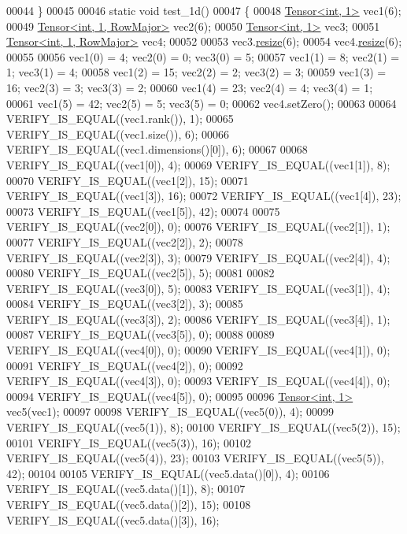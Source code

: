 \begin{DoxyCode}
00044 \}
00045 
00046 \textcolor{keyword}{static} \textcolor{keywordtype}{void} test\_1d()
00047 \{
00048   \hyperlink{class_eigen_1_1_tensor}{Tensor<int, 1>} vec1(6);
00049   \hyperlink{class_eigen_1_1_tensor}{Tensor<int, 1, RowMajor>} vec2(6);
00050   \hyperlink{class_eigen_1_1_tensor}{Tensor<int, 1>} vec3;
00051   \hyperlink{class_eigen_1_1_tensor}{Tensor<int, 1, RowMajor>} vec4;
00052 
00053   vec3.\hyperlink{class_eigen_1_1_tensor_a5ab1ec6dc9b05d5e4db3600bc9d2cc6b}{resize}(6);
00054   vec4.\hyperlink{class_eigen_1_1_tensor_a5ab1ec6dc9b05d5e4db3600bc9d2cc6b}{resize}(6);
00055 
00056   vec1(0) = 4;  vec2(0) = 0; vec3(0) = 5;
00057   vec1(1) = 8;  vec2(1) = 1; vec3(1) = 4;
00058   vec1(2) = 15; vec2(2) = 2; vec3(2) = 3;
00059   vec1(3) = 16; vec2(3) = 3; vec3(3) = 2;
00060   vec1(4) = 23; vec2(4) = 4; vec3(4) = 1;
00061   vec1(5) = 42; vec2(5) = 5; vec3(5) = 0;
00062   vec4.setZero();
00063 
00064   VERIFY\_IS\_EQUAL((vec1.rank()), 1);
00065   VERIFY\_IS\_EQUAL((vec1.size()), 6);
00066   VERIFY\_IS\_EQUAL((vec1.dimensions()[0]), 6);
00067 
00068   VERIFY\_IS\_EQUAL((vec1[0]), 4);
00069   VERIFY\_IS\_EQUAL((vec1[1]), 8);
00070   VERIFY\_IS\_EQUAL((vec1[2]), 15);
00071   VERIFY\_IS\_EQUAL((vec1[3]), 16);
00072   VERIFY\_IS\_EQUAL((vec1[4]), 23);
00073   VERIFY\_IS\_EQUAL((vec1[5]), 42);
00074 
00075   VERIFY\_IS\_EQUAL((vec2[0]), 0);
00076   VERIFY\_IS\_EQUAL((vec2[1]), 1);
00077   VERIFY\_IS\_EQUAL((vec2[2]), 2);
00078   VERIFY\_IS\_EQUAL((vec2[3]), 3);
00079   VERIFY\_IS\_EQUAL((vec2[4]), 4);
00080   VERIFY\_IS\_EQUAL((vec2[5]), 5);
00081 
00082   VERIFY\_IS\_EQUAL((vec3[0]), 5);
00083   VERIFY\_IS\_EQUAL((vec3[1]), 4);
00084   VERIFY\_IS\_EQUAL((vec3[2]), 3);
00085   VERIFY\_IS\_EQUAL((vec3[3]), 2);
00086   VERIFY\_IS\_EQUAL((vec3[4]), 1);
00087   VERIFY\_IS\_EQUAL((vec3[5]), 0);
00088 
00089   VERIFY\_IS\_EQUAL((vec4[0]), 0);
00090   VERIFY\_IS\_EQUAL((vec4[1]), 0);
00091   VERIFY\_IS\_EQUAL((vec4[2]), 0);
00092   VERIFY\_IS\_EQUAL((vec4[3]), 0);
00093   VERIFY\_IS\_EQUAL((vec4[4]), 0);
00094   VERIFY\_IS\_EQUAL((vec4[5]), 0);
00095 
00096   \hyperlink{class_eigen_1_1_tensor}{Tensor<int, 1>} vec5(vec1);
00097 
00098   VERIFY\_IS\_EQUAL((vec5(0)), 4);
00099   VERIFY\_IS\_EQUAL((vec5(1)), 8);
00100   VERIFY\_IS\_EQUAL((vec5(2)), 15);
00101   VERIFY\_IS\_EQUAL((vec5(3)), 16);
00102   VERIFY\_IS\_EQUAL((vec5(4)), 23);
00103   VERIFY\_IS\_EQUAL((vec5(5)), 42);
00104 
00105   VERIFY\_IS\_EQUAL((vec5.data()[0]), 4);
00106   VERIFY\_IS\_EQUAL((vec5.data()[1]), 8);
00107   VERIFY\_IS\_EQUAL((vec5.data()[2]), 15);
00108   VERIFY\_IS\_EQUAL((vec5.data()[3]), 16);

\end{DoxyCode}
